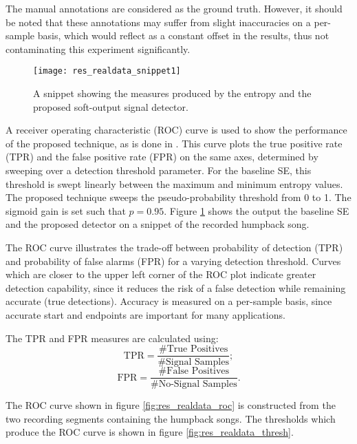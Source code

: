 The manual annotations are considered as the ground truth. However, it should be noted that these annotations may suffer from slight inaccuracies on a per-sample basis, which would reflect as a constant offset in the results, thus not contaminating this experiment significantly.

 \begin{figure}[h!]
	\centering
	\texttt{[image: res\_realdata\_snippet1]}
	\caption[A snippet showing the measures produced by the proposed entropy detector.]{A snippet showing the measures produced by the entropy and the proposed soft-output signal detector.}
	\label{fig:res_realdata_snippet1}
\end{figure}

A receiver operating characteristic (ROC) curve is used to show the performance of the proposed technique, as is done in \citep{entropyJASA}. This curve plots the true positive rate (TPR) and the false positive rate (FPR) on the same axes, determined by sweeping over a detection threshold parameter. For the baseline SE, this threshold is swept linearly between the maximum and minimum entropy values. The proposed technique sweeps the pseudo-probability threshold from 0 to 1. The sigmoid gain is set such that $p=0.95$. Figure \ref{fig:res_realdata_snippet1} shows the output the baseline SE and the proposed detector on a snippet of the recorded humpback song.



The ROC curve illustrates the trade-off between probability of detection (TPR) and probability of false alarms (FPR) for a varying detection threshold. Curves which are closer to the upper left corner of the ROC plot indicate greater detection capability, since it reduces the risk of a false detection while remaining accurate (true detections). Accuracy is measured on a per-sample basis, since accurate start and endpoints are important for many applications.

The TPR and FPR measures are calculated using:
\begin{equation*}
	\text{TPR} = \frac{\text{\# True Positives}}{\text{\# Signal Samples}};
\end{equation*}
\begin{equation*}
	\text{FPR} = \frac{\text{\# False Positives}}{\text{\# No-Signal Samples}}.
\end{equation*}




The ROC curve shown in figure \ref{fig:res_realdata_roc} is constructed from the two recording segments containing the humpback songs. The thresholds which produce the ROC curve is shown in figure \ref{fig:res_realdata_thresh}. 


